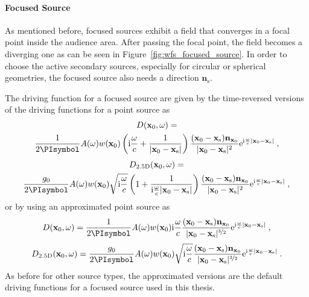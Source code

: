 \documentclass[a4paper]{book}
\newcommand{\reproduce}[1]{%
    \href{#1}{\color{link}\large\Pointinghand}%
}%
\newcommand{\ft}{\footnotesize}                                   %
\newcommand{\PI}{\PIsymbol}%
\newcommand{\I}{\mathrm{i}}                          %
\newcommand{\E}{\mathrm{e}}                          %
\renewcommand{\vec}[1]{\mathbf{#1}}                  %
\newcommand{\x}{\vec{x}}                             %
\newcommand{\xs}{\x_\text{s}}                        %
\newcommand{\xref}{\x_\text{ref}}                    %
\newcommand{\n}{\vec{n}}                             %
\newcommand{\omegac}{\frac{\omega}{c}}               %
\newcommand{\qc}{\;,}                                             %
\newcommand{\qp}{\;.}                                             %
\def \twohalfD {{2.5\text{D}}\xspace}                             %
\newcommand\eqlabel[2][]{%
  \label{eq:#2}%
}
\begin{document}
\paragraph{Focused Source}
%
%    
%
As mentioned before, focused sources exhibit a field that converges in a focal
point inside the audience area. After passing the focal
point, the field becomes a diverging one as can be seen in
Figure~\ref{fig:wfs_focused_source}. In order to choose the active secondary
sources, especially for circular or spherical geometries, the focused source
also needs a direction $\n_\text{s}$.

The driving function for a focused source are given by the time-reversed
versions of the driving functions for a point source as
%
\begin{multline}
    D(\x_0,\omega) = \\
    \frac{1}{2\PI} A(\omega) w(\x_0) \left(\I\omegac +
    \frac{1}{|\x_0-\xs|} \right) \frac{(\x_0-\xs)\n_{\x_0}}{|\x_0-\xs|^2}
    \E^{\I\omegac |\x_0-\xs|} \qc
    \eqlabel{D:wfs:fs:woapprox}
\end{multline}
%
\begin{multline}
    D_\twohalfD(\x_0,\omega) = \\
    \frac{g_0}{2\PI} A(\omega) w(\x_0) \sqrt{\I\omegac} \left(
    1 + \frac{1}{\I\omegac|\x_0-\xs|}
    \right) \frac{(\x_0-\xs) \n_{\x_0}}{|\x_0-\xs|^2} \E^{\I\omegac |\x_0-\xs|}
    \qc
    \eqlabel{D:wfs:fs:woapprox:2.5D}
\end{multline}
%
or by using an approximated point source as
%
\begin{equation}
    D(\x_0,\omega) = \frac{1}{2\PI} A(\omega) w(\x_0) \I\omegac
    \frac{(\x_0-\xs)\n_{\x_0}}{|\x_0-\xs|^{\nicefrac{3}{2}}}
    \E^{\I\omegac |\x_0-\xs|} \qc
    \eqlabel{D:wfs:fs}
\end{equation}
%
\begin{equation}
    D_\twohalfD(\x_0,\omega) = \frac{g_0}{2\PI} A(\omega) w(\x_0) \sqrt{\I\omegac}
    \frac{(\x_0-\xs)\n_{\x_0}}{|\x_0-\xs|^{\nicefrac{3}{2}}}
    \E^{\I\omegac |\x_0-\xs|} \qp
    \eqlabel{D:wfs:fs:2.5D}
\end{equation}
%
As before for other source types, the approximated versions are the default driving functions for a focused
source used in this thesis.
\end{document}
